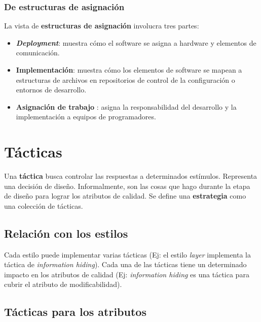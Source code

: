 \documentclass[]{article}
\begin{document}


\subsubsection{De estructuras de asignación}
La vista de \textbf{estructuras de asignación} involucra tres partes:
\begin{itemize}
    \item \textbf{\emph{Deployment}}: muestra cómo el software se asigna a hardware y elementos de comunicación.
    \item \textbf{Implementación}: muestra cómo los elementos de software se mapean a estructuras de archivos en repositorios de control de la configuración o entornos de desarrollo.
    \item \textbf{Asignación de trabajo} : asigna la responsabilidad del desarrollo y la implementación a equipos de programadores.
\end{itemize}

\section{Tácticas} \label{tacticas}
Una \textbf{táctica} busca controlar las respuestas a determinados estímulos. Representa una decisión de diseño. Informalmente, son las cosas que hago durante la etapa de diseño para lograr los atributos de calidad. Se define una \textbf{estrategia} como una colección de tácticas.

\subsection{Relación con los estilos}
Cada estilo puede implementar varias tácticas (Ej: el estilo \emph{layer} implementa la táctica de \emph{information hiding}). Cada una de las tácticas tiene un determinado impacto en los atributos de calidad (Ej: \emph{information hiding} es una táctica para cubrir el atributo de modificabilidad).

\subsection{Tácticas para los atributos}
\end{document}
